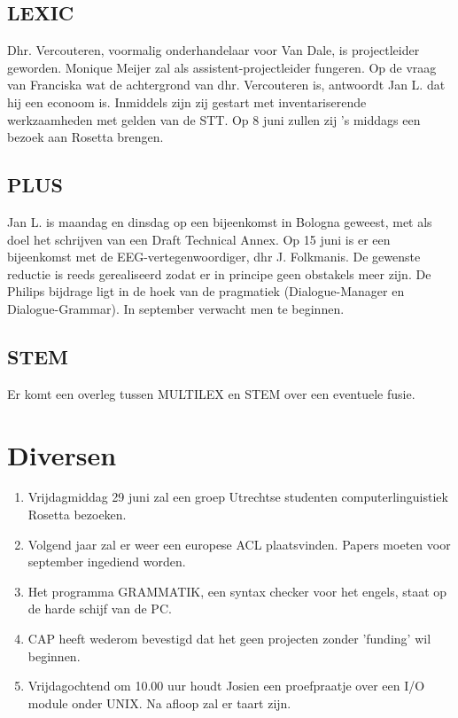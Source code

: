 \subsection {LEXIC}
Dhr. Vercouteren, voormalig onderhandelaar voor Van Dale, is projectleider 
geworden. Monique Meijer zal als assistent-projectleider fungeren. Op de vraag 
van Franciska wat de achtergrond van dhr. Vercouteren is, antwoordt Jan L. dat 
hij een econoom is. Inmiddels zijn zij gestart met inventariserende 
werkzaamheden met gelden van de STT. Op 8 juni zullen zij 's middags een bezoek 
aan Rosetta brengen. 

\subsection {PLUS}
Jan L. is maandag en dinsdag op een bijeenkomst in Bologna geweest, met als 
doel het schrijven van een Draft Technical Annex. Op 15 juni is er een 
bijeenkomst met de EEG-vertegenwoordiger, dhr J. Folkmanis. 
De gewenste reductie is reeds gerealiseerd zodat er in principe geen obstakels 
meer zijn. De Philips bijdrage 
ligt in de hoek van de pragmatiek (Dialogue-Manager en Dialogue-Grammar).
In september verwacht men te beginnen.

\subsection {STEM}
Er komt een overleg tussen MULTILEX en STEM over een eventuele fusie.
\section {Diversen}
\begin{itemize}
\begin{enumerate}
\item Vrijdagmiddag 29 juni zal een groep Utrechtse studenten 
computerlinguistiek Rosetta bezoeken.
\item Volgend jaar zal er weer een europese ACL plaatsvinden. Papers moeten 
voor september ingediend worden.
\item Het programma GRAMMATIK, een syntax checker voor het engels, staat op de 
harde schijf van de PC.
\item CAP heeft wederom bevestigd dat het geen projecten zonder 'funding' wil 
beginnen.
\item Vrijdagochtend om 10.00 uur houdt Josien een proefpraatje over een I/O 
module onder UNIX. Na afloop zal 
er taart zijn.
\end{enumerate}
\end{itemize}

